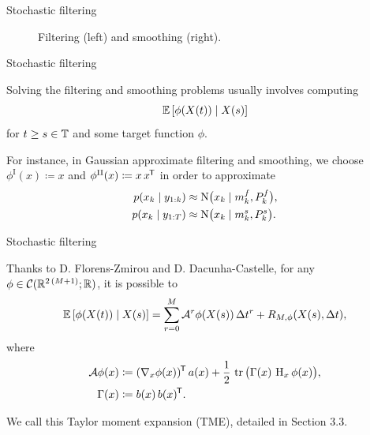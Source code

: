 \documentclass[seriffont, cmap=Beijing, 10pt]{zz}
\begin{document}
\begin{frame}{Stochastic filtering}
	\begin{block}{}
		\begin{figure}
			\centering
			\caption{Filtering (left) and smoothing (right).}
		\end{figure}
	\end{block}
\end{frame}

\begin{frame}{Stochastic filtering}
	\begin{block}{}
		Solving the \alert{filtering} and \alert{smoothing} problems usually involves computing
		\begin{equation}
			\expec{\phi(X(t)) \cond X(s)}
		\end{equation}
		for $t\geq s \in\mathbb{T}$ and some \alert{target function $\phi$}.
	\end{block}
	\begin{block}{}
		For instance, in \alert{Gaussian} approximate filtering and smoothing, we choose $\phi^\mathrm{I}(x)\coloneqq x$ and $\phi^\mathrm{II}(x)\coloneqq x \, x^{\mkern-1.5mu\mathsf{T}}$ in order to approximate
		\begin{equation}
			\begin{split}
				p(x_k {\;|\;} y_{1:k}) &\approx \mathrm{N}\big(x_k {\;|\;} m^f_k, P^f_k\big), \\
				p(x_k {\;|\;} y_{1:T}) &\approx \mathrm{N}\big(x_k {\;|\;} m^s_k, P^s_k\big).
			\end{split}
		\end{equation}
	\end{block}
\end{frame}

\begin{frame}{Stochastic filtering}
	\begin{block}{}
		Thanks to D. Florens-Zmirou and D. Dacunha-Castelle, for any $\phi\in \mathcal{C}(\mathbb{R}^{2\,(M+1)};\mathbb{R})$, it is possible to
		\begin{equation}
			\expec{\phi(X(t)) \cond X(s)} = \sum^M_{r=0} \A^r\phi(X(s))\,\Delta t^r + R_{M, \phi}(X(s), \Delta t),
		\end{equation}
		where
		\begin{equation}
			\begin{split}
				\mathcal{A}\phi(x) &\coloneqq (\nabla_x\phi(x))^{\mkern-1.5mu\mathsf{T}} \, a(x) + \frac{1}{2} \, \operatorname{tr} \big( \Gamma(x) \, \operatorname{H}_x\phi(x) \big),\\
				\Gamma(x) &\coloneqq b(x) \, b(x)^{\mkern-1.5mu\mathsf{T}}.
			\end{split}
		\end{equation}
	\end{block}
	\begin{block}{}
		We call this \alert{Taylor moment expansion (TME)}, detailed in Section 3.3.
	\end{block}
\end{frame}
\end{document}
